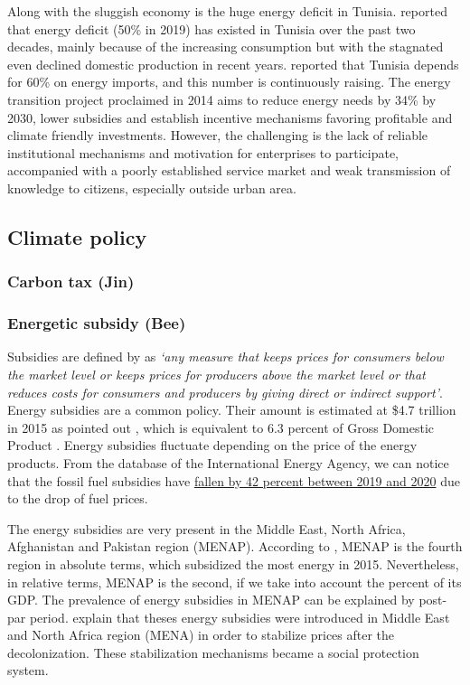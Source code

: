 \documentclass[
]{article}
\begin{document}
Along with the sluggish economy is the huge energy deficit in Tunisia.
\textcite{irena2021} reported that energy deficit (50\% in 2019) has
existed in Tunisia over the past two decades, mainly because of the
increasing consumption but with the stagnated even declined domestic
production in recent years. \textcite{giz} reported that Tunisia depends
for 60\% on energy imports, and this number is continuously raising. The
energy transition project proclaimed in 2014 aims to reduce energy needs
by 34\% by 2030, lower subsidies and establish incentive mechanisms
favoring profitable and climate friendly investments. However, the
challenging is the lack of reliable institutional mechanisms and
motivation for enterprises to participate, accompanied with a poorly
established service market and weak transmission of knowledge to
citizens, especially outside urban area.

\hypertarget{climate-policy}{%
\subsection{Climate policy}\label{climate-policy}}

\hypertarget{carbon-tax-jin}{%
\subsubsection{Carbon tax (Jin)}\label{carbon-tax-jin}}

\hypertarget{energetic-subsidy-bee}{%
\subsubsection{Energetic subsidy (Bee)}\label{energetic-subsidy-bee}}

Subsidies are defined by \textcite{demoor1997} as \emph{`any measure
that keeps prices for consumers below the market level or keeps prices
for producers above the market level or that reduces costs for consumers
and producers by giving direct or indirect support'}. Energy subsidies
are a common policy. Their amount is estimated at \$4.7 trillion in 2015
as pointed out \textcite{coady2019}, which is equivalent to 6.3 percent
of Gross Domestic Product . Energy subsidies fluctuate depending on the
price of the energy products. From the database of the International
Energy Agency, we can notice that the fossil fuel subsidies have
\href{https://www.iea.org/topics/energy-subsidies}{fallen by 42 percent
between 2019 and 2020} due to the drop of fuel prices.

The energy subsidies are very present in the Middle East, North Africa,
Afghanistan and Pakistan region (MENAP). According to
\textcite{coady2019}, MENAP is the fourth region in absolute terms,
which subsidized the most energy in 2015. Nevertheless, in relative
terms, MENAP is the second, if we take into account the percent of its
GDP. The prevalence of energy subsidies in MENAP can be explained by
post-par period. \textcite{verme2017} explain that theses energy
subsidies were introduced in Middle East and North Africa region (MENA)
in order to stabilize prices after the decolonization. These
stabilization mechanisms became a social protection system.
\end{document}
